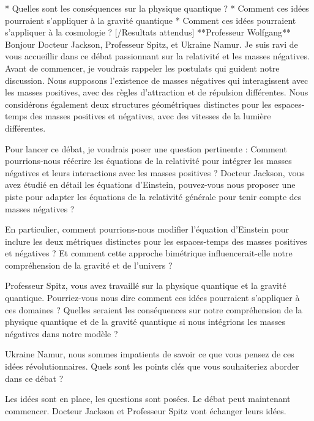 * Quelles sont les conséquences sur la physique quantique ?
* Comment ces idées pourraient s'appliquer à la gravité quantique
* Comment ces idées pourraient s'appliquer à la cosmologie ?
[/Resultats attendus]
**Professeur Wolfgang**
Bonjour Docteur Jackson, Professeur Spitz, et Ukraine Namur. Je suis ravi de vous accueillir dans ce débat passionnant sur la relativité et les masses négatives. Avant de commencer, je voudrais rappeler les postulats qui guident notre discussion. Nous supposons l'existence de masses négatives qui interagissent avec les masses positives, avec des règles d'attraction et de répulsion différentes. Nous considérons également deux structures géométriques distinctes pour les espaces-temps des masses positives et négatives, avec des vitesses de la lumière différentes.

Pour lancer ce débat, je voudrais poser une question pertinente : Comment pourrions-nous réécrire les équations de la relativité pour intégrer les masses négatives et leurs interactions avec les masses positives ? Docteur Jackson, vous avez étudié en détail les équations d'Einstein, pouvez-vous nous proposer une piste pour adapter les équations de la relativité générale pour tenir compte des masses négatives ?

En particulier, comment pourrions-nous modifier l'équation d'Einstein pour inclure les deux métriques distinctes pour les espaces-temps des masses positives et négatives ? Et comment cette approche bimétrique influencerait-elle notre compréhension de la gravité et de l'univers ?

Professeur Spitz, vous avez travaillé sur la physique quantique et la gravité quantique. Pourriez-vous nous dire comment ces idées pourraient s'appliquer à ces domaines ? Quelles seraient les conséquences sur notre compréhension de la physique quantique et de la gravité quantique si nous intégrions les masses négatives dans notre modèle ?

Ukraine Namur, nous sommes impatients de savoir ce que vous pensez de ces idées révolutionnaires. Quels sont les points clés que vous souhaiteriez aborder dans ce débat ?

Les idées sont en place, les questions sont posées. Le débat peut maintenant commencer.
Docteur Jackson et Professeur Spitz vont échanger leurs idées.

